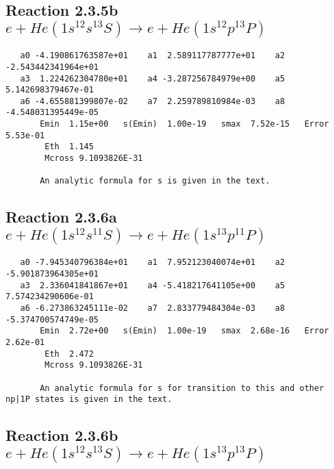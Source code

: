 \documentclass[12pt,dvipdfmx]{article}
\begin{document}
\subsection{
Reaction 2.3.5b $   e + He(1s^12s^13S) \rightarrow e + He(1s^12p^13P)$}





\begin{small}\begin{verbatim}
   a0 -4.190861763587e+01    a1  2.589117787777e+01    a2 -2.543442341964e+01
   a3  1.224262304780e+01    a4 -3.287256784979e+00    a5  5.142698379467e-01
   a6 -4.655881399807e-02    a7  2.259789810984e-03    a8 -4.548031395449e-05
       Emin  1.15e+00   s(Emin)  1.00e-19   smax  7.52e-15   Error  5.53e-01
        Eth  1.145
        Mcross 9.1093826E-31

       An analytic formula for s is given in the text.
\end{verbatim}\end{small}




\newpage
\subsection{
Reaction 2.3.6a $   e + He(1s^12s^11S) \rightarrow e + He(1s^13p^11P)$}





\begin{small}\begin{verbatim}
   a0 -7.945340796384e+01    a1  7.952123040074e+01    a2 -5.901873964305e+01
   a3  2.336041841867e+01    a4 -5.418217641105e+00    a5  7.574234290606e-01
   a6 -6.273863245111e-02    a7  2.833779484304e-03    a8 -5.374700574749e-05
       Emin  2.72e+00   s(Emin)  1.00e-19   smax  2.68e-16   Error  2.62e-01
        Eth  2.472
        Mcross 9.1093826E-31

       An analytic formula for s for transition to this and other np|1P states is given in the text.
\end{verbatim}\end{small}




\newpage
\subsection{
Reaction 2.3.6b $  e + He(1s^12s^13S) \rightarrow e + He(1s^13p^13P)$}
\end{document}
